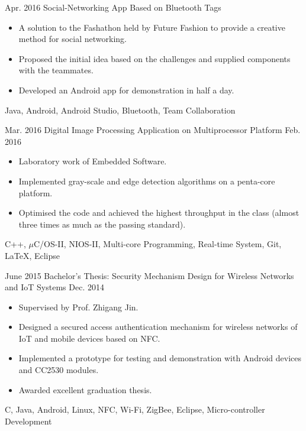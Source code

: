 \begin{projects}
  
  \project
    {Apr. 2016}     {Social-Networking App Based on Bluetooth Tags}
    {}    {
                      \begin{itemize}
                       \item A solution to the Fashathon held by Future Fashion to provide a creative method for social networking.
                       \item Proposed the initial idea based on the challenges and supplied components with the teammates.
						\item Developed an Android app for demonstration in half a day.
                      \end{itemize}
                    }
                    {Java, Android, Android Studio, Bluetooth, Team Collaboration}
  \emptySeparator
  
  
  \project
  {Mar. 2016}       {Digital Image Processing Application on Multiprocessor Platform}
  {Feb. 2016}      {
                      \begin{itemize}
                       \item Laboratory work of Embedded Software.
						\item Implemented gray-scale and edge detection algorithms on a penta-core platform.
						\item Optimised the code and achieved the highest throughput in the class (almost three times as much as the passing standard).
                      \end{itemize}
                    }
                    {C++, $\mu$C/OS-II, NIOS-II, Multi-core Programming, Real-time System, Git, \LaTeX, Eclipse}
  \emptySeparator
  


  \project
  {June 2015}		{Bachelor's Thesis: Security Mechanism Design for Wireless Networks and IoT Systems}
  {Dec. 2014}		{
  	\begin{itemize}
  		\item Supervised by Prof. Zhigang Jin.
  		\item Designed a secured access authentication mechanism for wireless networks of IoT and mobile devices based on NFC.
  		\item Implemented a prototype for testing and demonstration with Android devices and CC2530 modules.
  		\item Awarded excellent graduation thesis.
  	\end{itemize}
  }
  {C, Java, Android, Linux, NFC, Wi-Fi, ZigBee, Eclipse, Micro-controller Development}

\end{projects}

